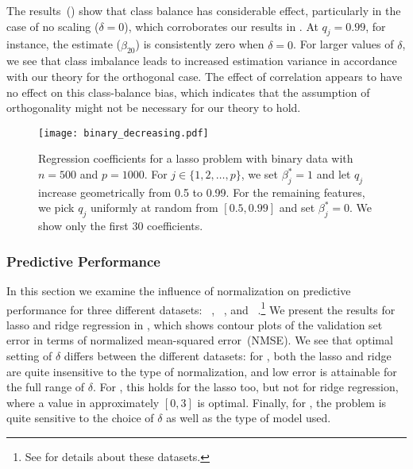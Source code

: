 The results~() show that class balance has considerable effect,
particularly in the case of no scaling (\(\delta = 0\)), which corroborates our results in
. At \(q_j=0.99\), for instance, the estimate
(\(\hat{\beta}_{20}\)) is consistently zero when \(\delta = 0\). For larger values of
\(\delta\), we see that class imbalance leads to increased estimation variance in
accordance with our theory for the orthogonal case. The effect of correlation appears to
have no effect on this class-balance bias, which indicates that the assumption of
orthogonality might not be necessary for our theory to hold.

\begin{figure}[htpb]
  \centering
  \texttt{[image: binary\_decreasing.pdf]}
  \caption{%
    Regression coefficients for a lasso problem with binary data with \(n = 500\) and \(p =
    \num{1000}\). For \(j \in \{1,2,\dots,p\}\), we set \(\beta_j^* = 1\) and
    let \(q_j\) increase geometrically from 0.5 to 0.99. For the remaining features,
    we pick \(q_j\) uniformly at random from \([0.5, 0.99]\) and
    set \(\beta_j^* = 0\). We show only the first 30 coefficients.
  }
  \label{fig:binary-decreasing}
\end{figure}

\subsubsection{Predictive Performance}
\label{sec:experiments-predictive-performance}

In this section we examine the influence of normalization on predictive performance for
three different datasets: ~\citep{rhee2006},
~\citep{chen2004}, and
~\citep{hirst1994,king1995}.\footnote{See  for
  details about these datasets.} We present the results for lasso and ridge regression in
, which shows contour plots of the validation set error in
terms of normalized mean-squared error~(NMSE). We see that optimal setting of \(\delta\)
differs between the different datasets: for , both the lasso and ridge
are quite insensitive to the type of normalization, and low error is attainable for the
full range of \(\delta\). For , this holds for the lasso too, but not for
ridge regression, where a value in approximately \([0,3]\) is optimal. Finally, for
, the problem is quite sensitive to the choice of \(\delta\) as well as the
type of model used.

